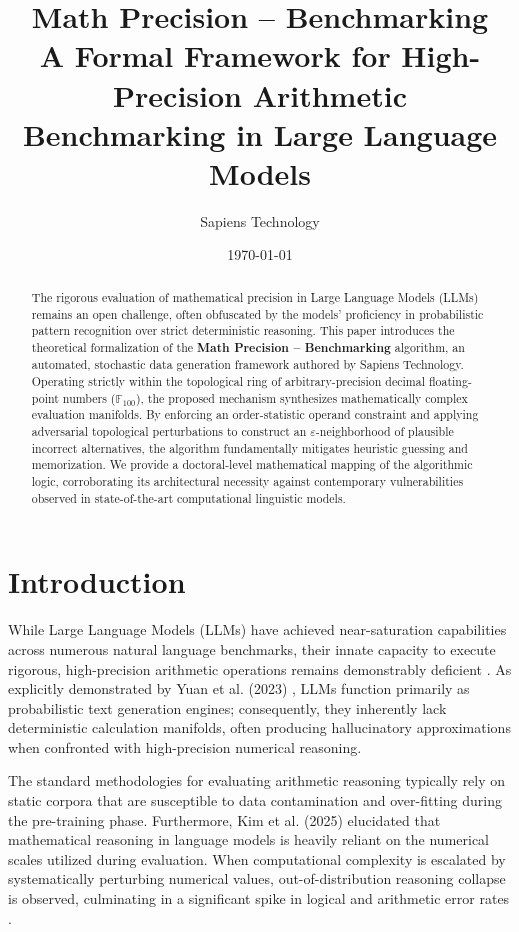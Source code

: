 \documentclass[12pt, a4paper]{article}
\title{\textbf{Math Precision -- Benchmarking}\\
\Large A Formal Framework for High-Precision Arithmetic Benchmarking in Large Language Models}
\author{Sapiens Technology\textregistered}
\date{\today}
\begin{document}
\maketitle

\begin{abstract}
The rigorous evaluation of mathematical precision in Large Language Models (LLMs) remains an open challenge, often obfuscated by the models' proficiency in probabilistic pattern recognition over strict deterministic reasoning. This paper introduces the theoretical formalization of the \textbf{Math Precision -- Benchmarking} algorithm, an automated, stochastic data generation framework authored by Sapiens Technology\textregistered. Operating strictly within the topological ring of arbitrary-precision decimal floating-point numbers ($\mathbb{F}_{100}$), the proposed mechanism synthesizes mathematically complex evaluation manifolds. By enforcing an order-statistic operand constraint and applying adversarial topological perturbations to construct an $\varepsilon$-neighborhood of plausible incorrect alternatives, the algorithm fundamentally mitigates heuristic guessing and memorization. We provide a doctoral-level mathematical mapping of the algorithmic logic, corroborating its architectural necessity against contemporary vulnerabilities observed in state-of-the-art computational linguistic models.
\end{abstract}

\tableofcontents
\newpage

\section{Introduction}

While Large Language Models (LLMs) have achieved near-saturation capabilities across numerous natural language benchmarks, their innate capacity to execute rigorous, high-precision arithmetic operations remains demonstrably deficient \cite{hendrycks2021}. As explicitly demonstrated by Yuan et al. (2023) \cite{yuan2023}, LLMs function primarily as probabilistic text generation engines; consequently, they inherently lack deterministic calculation manifolds, often producing hallucinatory approximations when confronted with high-precision numerical reasoning.

The standard methodologies for evaluating arithmetic reasoning typically rely on static corpora that are susceptible to data contamination and over-fitting during the pre-training phase. Furthermore, Kim et al. (2025) \cite{kim2025} elucidated that mathematical reasoning in language models is heavily reliant on the numerical scales utilized during evaluation. When computational complexity is escalated by systematically perturbing numerical values, out-of-distribution reasoning collapse is observed, culminating in a significant spike in logical and arithmetic error rates \cite{kim2025}.
\end{document}
